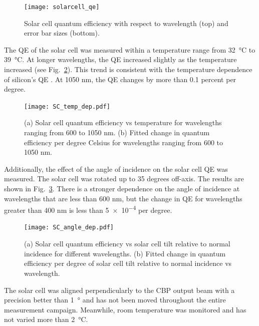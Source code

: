 \begin{figure}[!h]
\centering
\texttt{[image: solarcell\_qe]}
\caption{Solar cell quantum efficiency with respect to wavelength (top) and error bar sizes (bottom).}
\label{fig:sc_qe}
\end{figure}

The QE of the solar cell was measured within a temperature range from \SI{32}{\degreeCelsius} to \SI{39}{\degreeCelsius}. At longer wavelengths, the QE increased slightly as the temperature increased (see Fig.~\ref{fig:SC_temp}). This trend is consistent with the temperature dependence of silicon's QE \citep{Green_2008}. At 1050 nm, the QE changes by more than 0.1 percent per degree.
\begin{figure}[!h]
\centering
\texttt{[image: SC\_temp\_dep.pdf]}
\caption{(a) Solar cell quantum efficiency vs temperature for wavelengths ranging from 600 to 1050 nm. (b) Fitted change in quantum efficiency per degree Celsius for wavelengths ranging from 600 to 1050 nm.}
\label{fig:SC_temp}
\end{figure}

Additionally, the effect of the angle of incidence on the solar cell QE was measured. The solar cell was rotated up to 35 degrees off-axis. The results are shown in Fig.~\ref{fig:SC_angle}. There is a stronger dependence on the angle of incidence at wavelengths that are less than 600 nm, but the change in QE for wavelengths greater than 400 nm is less than \num{5e-4}	 per degree.
\begin{figure}[!h]
\centering
\texttt{[image: SC\_angle\_dep.pdf]}
\caption{(a) Solar cell quantum efficiency vs solar cell tilt relative to normal incidence for different wavelengths. (b) Fitted change in quantum efficiency per degree of solar cell tilt relative to normal incidence vs wavelength.}
\label{fig:SC_angle}
\end{figure}

The solar cell was aligned perpendicularly to the CBP output beam with a precision better than \SI{1}{\degree} and has not been moved throughout the entire measurement campaign. Meanwhile, room temperature was monitored and has not varied more than \SI{2}{\degreeCelsius}.

%

